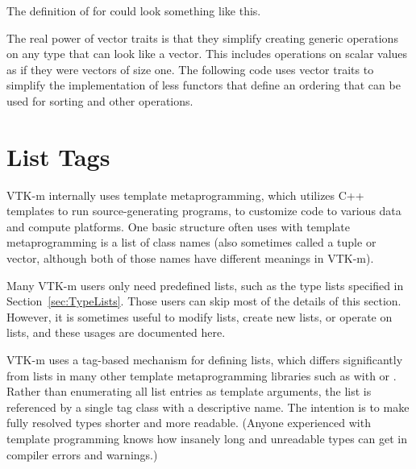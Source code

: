 The definition of  for  could look something like
this.


The real power of vector traits is that they simplify creating generic
operations on any type that can look like a vector. This includes
operations on scalar values as if they were vectors of size one. The
following code uses vector traits to simplify the implementation of less
functors that define an ordering that can be used for sorting
and other operations.





\section{List Tags}
\label{sec:ListTags}


VTK-m internally uses template metaprogramming, which utilizes C++
templates to run source-generating programs, to customize code to various
data and compute platforms. One basic structure often uses with template
metaprogramming is a list of class names (also sometimes called a tuple or
vector, although both of those names have different meanings in VTK-m).

Many VTK-m users only need predefined lists, such as the type lists
specified in Section~\ref{sec:TypeLists}. Those users can skip most of the
details of this section. However, it is sometimes useful to modify lists,
create new lists, or operate on lists, and these usages are documented
here.

VTK-m uses a tag-based mechanism for defining lists, which differs
significantly from lists in many other template metaprogramming libraries
such as with  or
. Rather than enumerating all list
entries as template arguments, the list is referenced by a single tag class
with a descriptive name. The intention is to make fully resolved types
shorter and more readable. (Anyone experienced with template programming
knows how insanely long and unreadable types can get in compiler errors and
warnings.)

